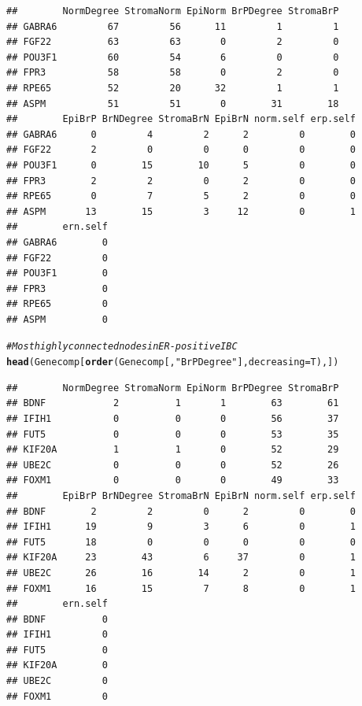 \documentclass{article}\usepackage[]{graphicx}\usepackage[]{color}
\makeatletter
\newcommand{\hlstr}[1]{\textcolor[rgb]{0.192,0.494,0.8}{#1}}%
\newcommand{\hlcom}[1]{\textcolor[rgb]{0.678,0.584,0.686}{\textit{#1}}}%
\newcommand{\hlstd}[1]{\textcolor[rgb]{0.345,0.345,0.345}{#1}}%
\newcommand{\hlkwc}[1]{\textcolor[rgb]{0.333,0.667,0.333}{#1}}%
\newcommand{\hlkwd}[1]{\textcolor[rgb]{0.737,0.353,0.396}{\textbf{#1}}}%
\newenvironment{kframe}{%
 \def\at@end@of@kframe{}%
 \ifinner\ifhmode%
  \def\at@end@of@kframe{\end{minipage}}%
  \begin{minipage}{\columnwidth}%
 \fi\fi%
 \def\FrameCommand##1{\hskip\@totalleftmargin \hskip-\fboxsep
 \colorbox{shadecolor}{##1}\hskip-\fboxsep
     \hskip-\linewidth \hskip-\@totalleftmargin \hskip\columnwidth}%
 \MakeFramed {\advance\hsize-\width
   \@totalleftmargin\z@ \linewidth\hsize
   \@setminipage}}%
 {\par\unskip\endMakeFramed%
 \at@end@of@kframe}
\newenvironment{knitrout}{}{} %
\makeatother
\begin{document}
\begin{knitrout}
\begin{kframe}
\begin{alltt}
\end{alltt}
\begin{verbatim}
##        NormDegree StromaNorm EpiNorm BrPDegree StromaBrP
## GABRA6         67         56      11         1         1
## FGF22          63         63       0         2         0
## POU3F1         60         54       6         0         0
## FPR3           58         58       0         2         0
## RPE65          52         20      32         1         1
## ASPM           51         51       0        31        18
##        EpiBrP BrNDegree StromaBrN EpiBrN norm.self erp.self
## GABRA6      0         4         2      2         0        0
## FGF22       2         0         0      0         0        0
## POU3F1      0        15        10      5         0        0
## FPR3        2         2         0      2         0        0
## RPE65       0         7         5      2         0        0
## ASPM       13        15         3     12         0        1
##        ern.self
## GABRA6        0
## FGF22         0
## POU3F1        0
## FPR3          0
## RPE65         0
## ASPM          0
\end{verbatim}
\begin{alltt}
\hlcom{# Most highly connected nodes in ER-positive IBC}
\hlkwd{head}\hlstd{(Genecomp[}\hlkwd{order}\hlstd{(Genecomp[,}\hlstr{"BrPDegree"}\hlstd{],}\hlkwc{decreasing}\hlstd{=T),])}
\end{alltt}
\begin{verbatim}
##        NormDegree StromaNorm EpiNorm BrPDegree StromaBrP
## BDNF            2          1       1        63        61
## IFIH1           0          0       0        56        37
## FUT5            0          0       0        53        35
## KIF20A          1          1       0        52        29
## UBE2C           0          0       0        52        26
## FOXM1           0          0       0        49        33
##        EpiBrP BrNDegree StromaBrN EpiBrN norm.self erp.self
## BDNF        2         2         0      2         0        0
## IFIH1      19         9         3      6         0        1
## FUT5       18         0         0      0         0        0
## KIF20A     23        43         6     37         0        1
## UBE2C      26        16        14      2         0        1
## FOXM1      16        15         7      8         0        1
##        ern.self
## BDNF          0
## IFIH1         0
## FUT5          0
## KIF20A        0
## UBE2C         0
## FOXM1         0
\end{verbatim}
\begin{alltt}

\end{alltt}
\end{kframe}
\end{knitrout}
\end{document}
